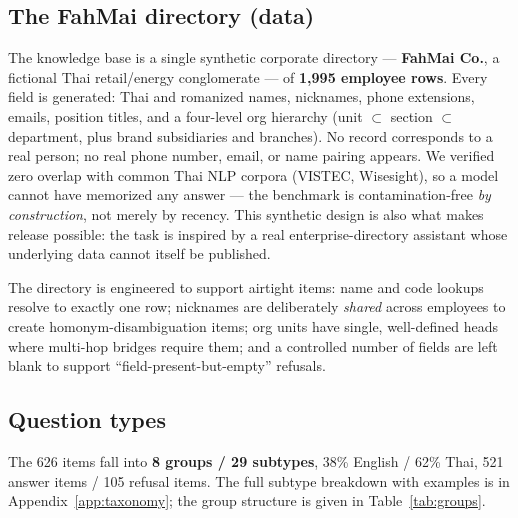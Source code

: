 \documentclass[11pt]{article}
\begin{document}
\subsection{The FahMai directory (data)}
\label{sec:data}

The knowledge base is a single synthetic corporate directory --- \textbf{FahMai Co.}, a fictional Thai
retail/energy conglomerate --- of \textbf{1{,}995 employee rows}. Every field is generated: Thai and
romanized names, nicknames, phone extensions, emails, position titles, and a four-level org hierarchy
(unit $\subset$ section $\subset$ department, plus brand subsidiaries and branches). No record
corresponds to a real person; no real phone number, email, or name pairing appears. We verified zero
overlap with common Thai NLP corpora (VISTEC, Wisesight), so a model cannot have memorized any answer
--- the benchmark is contamination-free \emph{by construction}, not merely by recency. This synthetic
design is also what makes release possible: the task is inspired by a real enterprise-directory
assistant whose underlying data cannot itself be published.

The directory is engineered to support airtight items: name and code lookups resolve to exactly one
row; nicknames are deliberately \emph{shared} across employees to create homonym-disambiguation items;
org units have single, well-defined heads where multi-hop bridges require them; and a controlled number
of fields are left blank to support ``field-present-but-empty'' refusals.

\subsection{Question types}

The 626 items fall into \textbf{8 groups / 29 subtypes}, 38\% English / 62\% Thai, 521 answer items /
105 refusal items. The full subtype breakdown with examples is in Appendix~\ref{app:taxonomy}; the
group structure is given in Table~\ref{tab:groups}.
\end{document}
